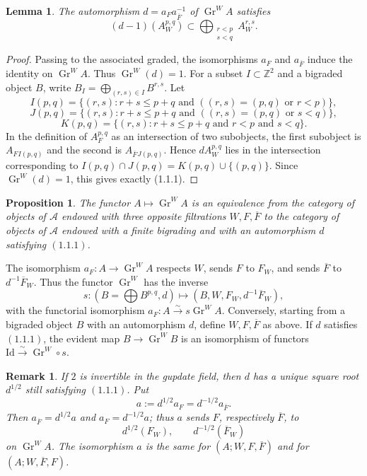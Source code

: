 \documentclass[11pt]{article}
\newtheorem{proposition}{Proposition}[section]
\newtheorem{lemma}{Lemma}[section]
\newtheorem{remark}{Remark}[section]
\newcommand{\Gr}{\operatorname{Gr}}
\begin{document}
\begin{lemma}
The automorphism \(d=a_Fa_{\overline F}^{-1}\) of \(\Gr^WA\) satisfies
\begin{equation}\tag{1.1.1}
   (d-1)(A_W^{p,q})\subset
   \bigoplus_{\substack{r<p\\ s<q}} A_W^{r,s}.
\end{equation}
\end{lemma}

\begin{proof}
Passing to the associated graded, the isomorphisms \(a_F\) and \(a_{\overline F}\) induce the identity on \(\Gr^WA\).  Thus \(\Gr^W(d)=1\).  For a subset \(I\subset \mathbb Z^2\) and a bigraded object \(B\), write \(B_I=\bigoplus_{(r,s)\in I}B^{r,s}\).  Let
\[
 I(p,q)=\{(r,s):r+s\le p+q\text{ and }((r,s)=(p,q)\text{ or }r<p)\},
\]
\[
 J(p,q)=\{(r,s):r+s\le p+q\text{ and }((r,s)=(p,q)\text{ or }s<q)\},
\]
\[
 K(p,q)=\{(r,s):r+s\le p+q\text{ and }r<p\text{ and }s<q\}.
\]
In the definition of \(A_F^{p,q}\) as an intersection of two subobjects, the first subobject is \(A_F{}_{I(p,q)}\) and the second is \(A_{\overline F}{}_{J(p,q)}\).  Hence \(dA_W^{p,q}\) lies in the intersection corresponding to \(I(p,q)\cap J(p,q)=K(p,q)\cup\{(p,q)\}\).  Since \(\Gr^W(d)=1\), this gives exactly (1.1.1).
\end{proof}

\begin{proposition}\label{prop:three-filtrations}
The functor \(A\mapsto \Gr^WA\) is an equivalence from the category of objects of \(\mathcal A\) endowed with three opposite filtrations \(W,F,\overline F\) to the category of objects of \(\mathcal A\) endowed with a finite bigrading and with an automorphism \(d\) satisfying \((1.1.1)\).
\end{proposition}

The isomorphism \(a_F:A\to\Gr^WA\) respects \(W\), sends \(F\) to \(F_W\), and sends \(\overline F\) to \(d^{-1}\overline F_W\).  Thus the functor \(\Gr^W\) has the inverse
\[
 s:(B=\bigoplus B^{p,q},d)\longmapsto (B,W,F_W,d^{-1}\overline F_W),
\]
with the functorial isomorphism \(a_F:A\xrightarrow{\sim}s\Gr^WA\).  Conversely, starting from a bigraded object \(B\) with an automorphism \(d\), define \(W,F,\overline F\) as above.  If \(d\) satisfies \((1.1.1)\), the evident map \(B\to\Gr^WB\) is an isomorphism of functors \(\mathrm{Id}\xrightarrow{\sim}\Gr^W\circ s\).

\begin{remark}\label{rem:half}
If \(2\) is invertible in the gupdate field, then \(d\) has a unique square root \(d^{1/2}\) still satisfying \((1.1.1)\).  Put
\[
 a:=d^{1/2}a_F=d^{-1/2}a_{\overline F}.
\]
Then \(a_{\overline F}=d^{1/2}a\) and \(a_F=d^{-1/2}a\); thus \(a\) sends \(F\), respectively \(\overline F\), to
\[
 d^{1/2}(F_W),\qquad d^{-1/2}(\overline F_W)
\]
on \(\Gr^WA\).  The isomorphism \(a\) is the same for \((A;W,F,\overline F)\) and for \((A;W,\overline F,F)\).
\end{remark}
\end{document}
